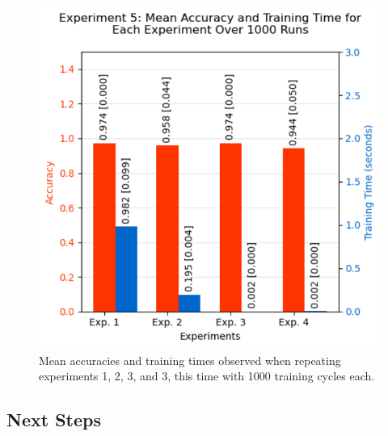 \documentclass{article}
\theoremstyle{plain}
\theoremstyle{definition}
\theoremstyle{remark}
\begin{document}
\begin{figure}[ht]
\vskip 0.2in
\begin{center}
\centerline{\includegraphics[width=\columnwidth]{experiment_5}}
\caption{Mean accuracies and training times observed when repeating experiments 1, 2, 3, and 3, this time with 1000 training cycles each.}
\label{experiment_1a}
\end{center}
\vskip -0.2in
\end{figure}


\subsection{Next Steps}
\end{document}
